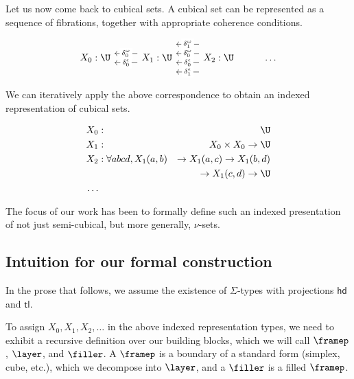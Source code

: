 \documentclass[10pt]{art.cls/art}
\newcommand{\tl}{\ensuremath{\mathsf{tl}}}
\newcommand{\hd}{\ensuremath{\mathsf{hd}}}
\begin{document}
Let us now come back to cubical sets. A cubical set can be represented as a sequence of fibrations, together with appropriate coherence conditions.

\begin{equation*}
  \begin{tikzcd}
    X_0 : \U & X_1 : \U \arrow[l, "\delta^\epsilon_0" description, shift left=2] \arrow[l, "\delta^\omega_0" description, shift right=2] & X_2 : \U \arrow[l, "\delta^\epsilon_1" description, shift left=6] \arrow[l, "\delta^\epsilon_0" description, shift left=2] \arrow[l, "\delta^\omega_0" description, shift right=2] \arrow[l, "\delta^\omega_1" description, shift right=6] & \ldots
  \end{tikzcd}
\end{equation*}

We can iteratively apply the above correspondence to obtain an indexed representation of cubical sets.

\begin{align*}
  X_0 & :                             & \U                                            \\
  X_1 & :                             & X_0 \times X_0 \rightarrow \U                 \\
  X_2 & : \forall a b c d, X_1 (a, b) & \rightarrow X_1 (a, c) \rightarrow X_1 (b, d) \\
      &                               & \rightarrow X_1 (c, d) \rightarrow \U         \\
  \ldots
\end{align*}

The focus of our work has been to formally define such an indexed presentation of not just semi-cubical, but more generally, $\nu$-sets.

\subsection{Intuition for our formal construction}
\begin{notation}[\Sigma]
  In the prose that follows, we assume the existence of $\Sigma$-types with projections $\hd$ and $\tl$.
\end{notation}

To assign $X_0, X_1, X_2, \ldots$ in the above indexed representation types, we need to exhibit a recursive definition over our building blocks, which we will call $\framep$, $\layer$, and $\filler$. A $\framep$ is a boundary of a standard form (simplex, cube, etc.), which we decompose into $\layer$, and a $\filler$ is a filled $\framep$.
\end{document}
